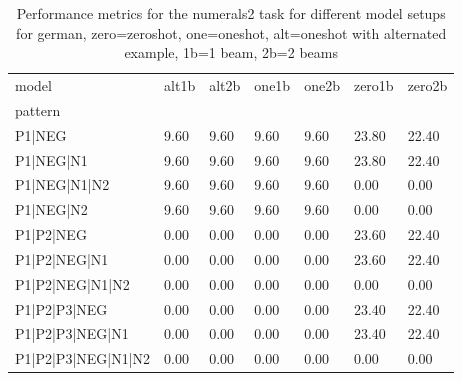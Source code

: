 \begin{table}[h]
\begin{tabular}{l|llllll}
\toprule
model & alt1b & alt2b & one1b & one2b & zero1b & zero2b \\
pattern &  &  &  &  &  &  \\
\midrule
P1|NEG & 9.60 & 9.60 & 9.60 & 9.60 & 23.80 & 22.40 \\
P1|NEG|N1 & 9.60 & 9.60 & 9.60 & 9.60 & 23.80 & 22.40 \\
P1|NEG|N1|N2 & 9.60 & 9.60 & 9.60 & 9.60 & 0.00 & 0.00 \\
P1|NEG|N2 & 9.60 & 9.60 & 9.60 & 9.60 & 0.00 & 0.00 \\
P1|P2|NEG & 0.00 & 0.00 & 0.00 & 0.00 & 23.60 & 22.40 \\
P1|P2|NEG|N1 & 0.00 & 0.00 & 0.00 & 0.00 & 23.60 & 22.40 \\
P1|P2|NEG|N1|N2 & 0.00 & 0.00 & 0.00 & 0.00 & 0.00 & 0.00 \\
P1|P2|P3|NEG & 0.00 & 0.00 & 0.00 & 0.00 & 23.40 & 22.40 \\
P1|P2|P3|NEG|N1 & 0.00 & 0.00 & 0.00 & 0.00 & 23.40 & 22.40 \\
P1|P2|P3|NEG|N1|N2 & 0.00 & 0.00 & 0.00 & 0.00 & 0.00 & 0.00 \\
\bottomrule
\end{tabular}
\caption{Performance metrics for the numerals2 task for different model setups for german, zero=zeroshot, one=oneshot, alt=oneshot with alternated example, 1b=1 beam, 2b=2 beams}
\label{tab:de_numerals2_performance}
\end{table}
